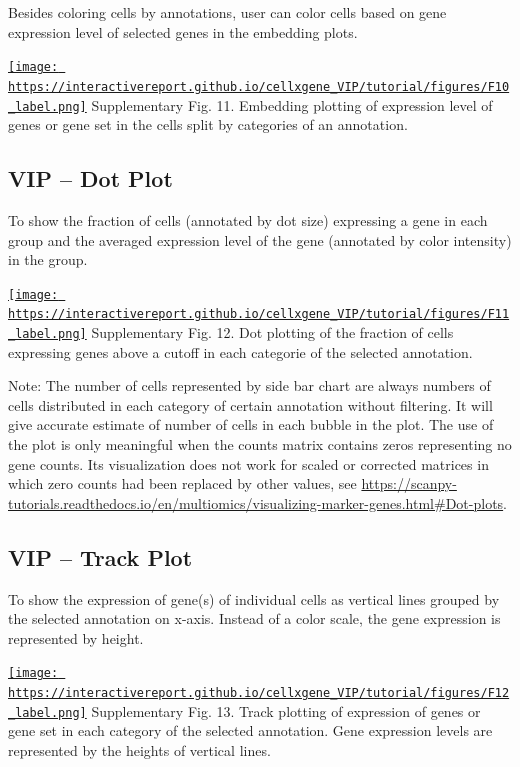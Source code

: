 \documentclass[
]{article}
\begin{document}
Besides coloring cells by annotations, user can color cells based on gene expression level of selected genes in the embedding plots.

\href{https://interactivereport.github.io/cellxgene_VIP/tutorial/figures/F10_label.png}{\texttt{[image: https://interactivereport.github.io/cellxgene\_VIP/tutorial/figures/F10\_label.png]}}
Supplementary Fig. 11. Embedding plotting of expression level of genes or gene set in the cells split by categories of an annotation.

\hypertarget{vip-dot-plot}{%
\subsection{VIP -- Dot Plot}\label{vip-dot-plot}}

To show the fraction of cells (annotated by dot size) expressing a gene in each group and the averaged expression level of the gene (annotated by color intensity) in the group.

\href{https://interactivereport.github.io/cellxgene_VIP/tutorial/figures/F11_label.png}{\texttt{[image: https://interactivereport.github.io/cellxgene\_VIP/tutorial/figures/F11\_label.png]}}
Supplementary Fig. 12. Dot plotting of the fraction of cells expressing genes above a cutoff in each categorie of the selected annotation.

Note: The number of cells represented by side bar chart are always numbers of cells distributed in each category of certain annotation without filtering. It will give accurate estimate of number of cells in each bubble in the plot. The use of the plot is only meaningful when the counts matrix contains zeros representing no gene counts. Its visualization does not work for scaled or corrected matrices in which zero counts had been replaced by other values, see \url{https://scanpy-tutorials.readthedocs.io/en/multiomics/visualizing-marker-genes.html\#Dot-plots}.

\hypertarget{vip-track-plot}{%
\subsection{VIP -- Track Plot}\label{vip-track-plot}}

To show the expression of gene(s) of individual cells as vertical lines grouped by the selected annotation on x-axis. Instead of a color scale, the gene expression is represented by height.

\href{https://interactivereport.github.io/cellxgene_VIP/tutorial/figures/F12_label.png}{\texttt{[image: https://interactivereport.github.io/cellxgene\_VIP/tutorial/figures/F12\_label.png]}}
Supplementary Fig. 13. Track plotting of expression of genes or gene set in each category of the selected annotation. Gene expression levels are represented by the heights of vertical lines.
\end{document}

